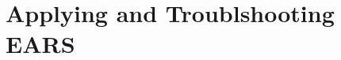 \documentclass[aspectratio=169]{beamer}
\begin{document}
%
%
%
%
%
\section*{Applying and Troublshooting EARS}
\end{document}
